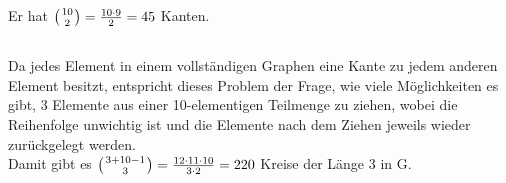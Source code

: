 \documentclass[fleqn]{article}
\newcommand*{\bfrac}[2]{\genfrac{}{}{0pt}{}{#1}{#2}}
\begin{document}
\section{}%
\subsection{}%
Er hat $\left(\bfrac{10}{2}\right) = \frac{10 \cdot 9}{2} = 45$ Kanten.
\subsection{}%
Da jedes Element in einem vollständigen Graphen eine Kante zu jedem anderen Element besitzt, entspricht dieses Problem der Frage, wie viele Möglichkeiten es gibt, 3 Elemente aus einer 10-elementigen Teilmenge zu ziehen, wobei die Reihenfolge unwichtig ist und die Elemente nach dem Ziehen jeweils wieder zurückgelegt werden.\\
Damit gibt es $\left(\bfrac{3 + 10 - 1}{3}\right) = \frac{12  \cdot 11 \cdot 10}{3 \cdot 2} = 220$ Kreise der Länge 3 in G.
\end{document}
